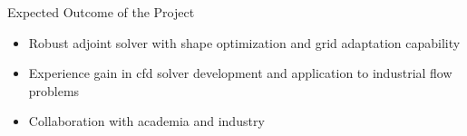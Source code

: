 \begin{frame}{Expected Outcome of the Project}
\begin{block}{}
\begin{itemize}
\item Robust adjoint solver with shape optimization and grid adaptation capability
\item Experience gain in cfd solver development and application to industrial flow problems
\item Collaboration with academia and industry

\end{itemize}
\end{block}
\end{frame}

%


